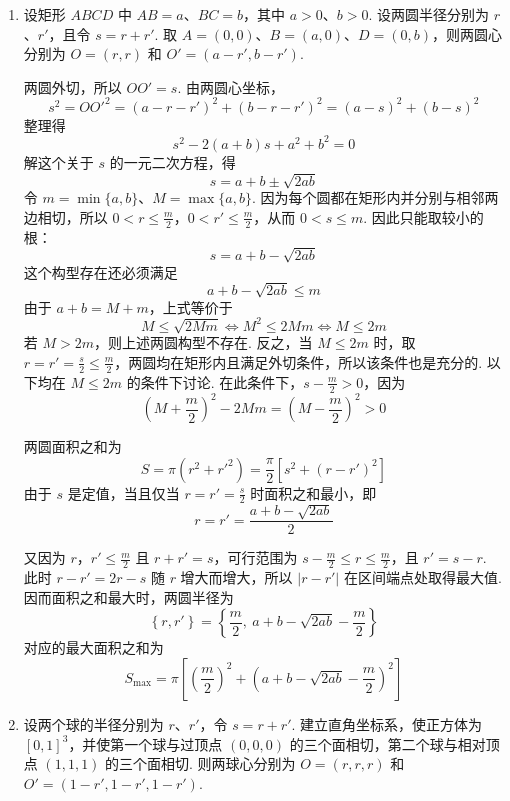 \begin{solution}
\begin{enumerate}
\item
设矩形 \(ABCD\) 中 \(AB=a\)、\(BC=b\)，其中 \(a>0\)、\(b>0\). 设两圆半径分别为 \(r\)、\(r'\)，且令 \(s=r+r'\). 取 \(A=(0,0)\)、\(B=(a,0)\)、\(D=(0,b)\)，则两圆心分别为 \(O=(r,r)\) 和 \(O'=(a-r',b-r')\).


两圆外切，所以 \(OO'=s\). 由两圆心坐标，
\[
s^2=OO'^2=\left( a-r-r' \right)^2+\left( b-r-r' \right)^2
=\left( a-s \right)^2+\left( b-s \right)^2
\]
整理得
\[
s^2-2\left( a+b \right)s+a^2+b^2=0
\]
解这个关于 \(s\) 的一元二次方程，得
\[
s=a+b\pm\sqrt{2ab}
\]
令 \(m=\min\{a,b\}\)、\(M=\max\{a,b\}\). 因为每个圆都在矩形内并分别与相邻两边相切，所以 \(0<r\le\frac{m}{2}\)，\(0<r'\le\frac{m}{2}\)，从而 \(0<s\le m\). 因此只能取较小的根：
\[
s=a+b-\sqrt{2ab}
\]
这个构型存在还必须满足
\[
a+b-\sqrt{2ab}\le m
\]
由于 \(a+b=M+m\)，上式等价于
\[
M\le\sqrt{2Mm}\iff M^2\le2Mm\iff M\le2m
\]
若 \(M>2m\)，则上述两圆构型不存在. 反之，当 \(M\le2m\) 时，取 \(r=r'=\frac{s}{2}\le\frac m2\)，两圆均在矩形内且满足外切条件，所以该条件也是充分的. 以下均在 \(M\le2m\) 的条件下讨论. 在此条件下，\(s-\frac m2>0\)，因为
\[
\left( M+\frac m2 \right)^2-2Mm=\left( M-\frac m2 \right)^2>0
\]

两圆面积之和为
\[
S=\pi\left( r^2+r'^2 \right)=\frac{\pi}{2}\left[ s^2+\left( r-r' \right)^2 \right]
\]
由于 \(s\) 是定值，当且仅当 \(r=r'=\frac{s}{2}\) 时面积之和最小，即
\[
r=r'=\frac{a+b-\sqrt{2ab}}{2}
\]

又因为 \(r\)，\(r'\le\frac{m}{2}\) 且 \(r+r'=s\)，可行范围为 \(s-\frac m2\le r\le\frac m2\)，且 \(r'=s-r\). 此时 \(r-r'=2r-s\) 随 \(r\) 增大而增大，所以 \(\lvert r-r'\rvert\) 在区间端点处取得最大值. 因而面积之和最大时，两圆半径为
\[
\left\{r,r'\right\}=\left\{\frac{m}{2},\ a+b-\sqrt{2ab}-\frac{m}{2}\right\}
\]
对应的最大面积之和为
\[
S_{\max}=\pi\left[\left( \frac{m}{2} \right)^2+\left( a+b-\sqrt{2ab}-\frac{m}{2} \right)^2\right]
\]

\item
设两个球的半径分别为 \(r\)、\(r'\)，令 \(s=r+r'\). 建立直角坐标系，使正方体为 \([0,1]^3\)，并使第一个球与过顶点 \((0,0,0)\) 的三个面相切，第二个球与相对顶点 \((1,1,1)\) 的三个面相切. 则两球心分别为 \(O=(r,r,r)\) 和 \(O'=(1-r',1-r',1-r')\).



\end{enumerate}
\end{solution}
